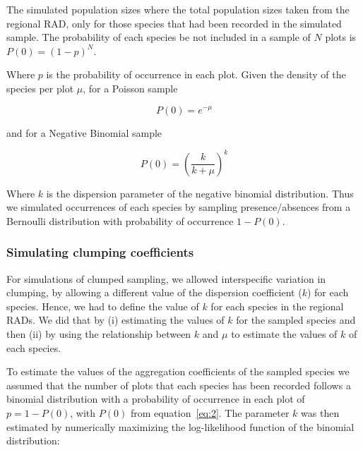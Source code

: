 \documentclass[12pt, A4]{article}\usepackage[]{graphicx}\usepackage[]{color}
\begin{document}
The simulated population sizes where the total population sizes taken from
the regional RAD, only for those species that had been recorded 
in the simulated sample. 
The probability of each species be not included in a sample of $N$ plots is  $P(0)=(1-p)^N$.

Where $p$ is the probability of occurrence in each plot. 
Given the density of the species per plot $\mu$, 
for a Poisson sample 

\begin{equation}
  \label{eq:3}
  P(0) = e^{-\mu} 
\end{equation} 

and for a Negative Binomial sample

\begin{equation}
  \label{eq:2}
  P(0) = \left( \frac{k}{k+\mu} \right)^k 
\end{equation}

Where $k$ is the dispersion parameter of the negative binomial distribution.
Thus we simulated occurrences of each species by sampling presence/absences
from a Bernoulli distribution with probability of occurrence $1-P(0)$.

\subsubsection*{Simulating clumping coefficients}

For simulations of clumped sampling, 
we allowed interspecific variation in clumping, 
by allowing a different value of the dispersion coefficient ($k$) for each species.
Hence, we had to define the value of $k$ for each species in the regional
RADs. We did that by (i) estimating the values of $k$ for the sampled species and
then (ii) by using the relationship between $k$ and $\mu$ to estimate the values of $k$
of each species.

To estimate the values of the aggregation coefficients
of the sampled species
we assumed that the number of plots that each species has been recorded follows
a binomial distribution with a probability of occurrence in each plot of $p=1-P(0)$,
with $P(0)$ from equation~\ref{eq:2}.
The parameter $k$ was then estimated by numerically maximizing the
log-likelihood function of the binomial distribution:
\end{document}
